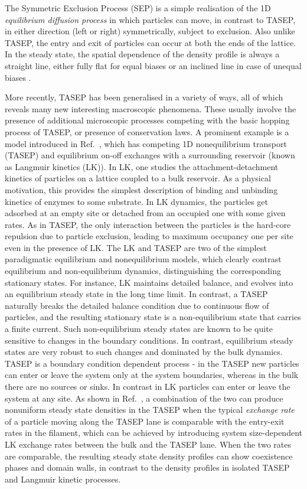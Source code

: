 \documentclass[aps,pre,twocolumn,superscriptaddress,amsmath,amssymb,longbibliography,floatfix,nofootinbib]{revtex4}
\begin{document}
The Symmetric Exclusion Process (SEP) is a simple realisation
of the 1D {\em equilibrium diffusion process} in which particles can move,
in contrast to TASEP, in either direction (left or right) symmetrically, subject to exclusion. Also unlike TASEP,
the entry and exit of particles can occur at both the ends of the lattice. In the steady state,
the spatial dependence of the density profile is always a straight line, either fully flat for
equal biases or an inclined line in case of unequal biases \cite{sep}.

More recently,  TASEP has been generalised in a variety of ways, all of which 
reveals many new interesting macroscopic phenomena. These usually involve the presence of additional  microscopic processes competing with the basic hopping process of TASEP, or presence of conservation laws. A prominent example is a model introduced in Ref.~\cite{frey-lktasep}, which has competing 1D nonequilibrium transport (TASEP)
and equilibrium on-off exchanges with a surrounding reservoir (known as Langmuir kinetics (LK)).
   In LK, one studies the attachment-detachment
kinetics of particles on a lattice coupled to a bulk reservoir. As a physical motivation, this provides the simplest description of binding and unbinding kinetics of enzymes to some substrate. In LK dynamics, the particles get adsorbed
at an empty site or detached from an occupied one with some given rates. As in TASEP,
the only interaction between the particles is the hard-core repulsion due to particle exclusion, leading to maximum occupancy one per site even in the presence of LK.
The LK and TASEP are two of the simplest paradigmatic equilibrium and nonequilibrium models, which clearly contrast
equilibrium and non-equilibrium dynamics, distinguishing the corresponding stationary states. For instance, LK maintains detailed balance, and evolves
into an equilibrium steady state in the long time limit. In contrast, a TASEP naturally breaks the detailed balance condition due to continuous flow of particles, and the resulting  stationary state is a
non-equilibrium state that carries a finite current. Such non-equilibrium steady
states are known to be quite sensitive to changes in the boundary conditions. In contrast, equilibrium steady
states are very robust to such changes and dominated by the bulk dynamics. TASEP is a boundary condition dependent process - in the TASEP
new particles can enter or leave the system only at the system boundaries, whereas
in the bulk there are no sources or sinks. In contrast in LK particles
can enter or leave the system at any site. As shown in Ref.~\cite{frey-lktasep}, a combination of the two can produce nonuniform steady state
densities in the TASEP when the typical    {\em exchange
rate} of a particle moving along the TASEP lane is comparable with the entry-exit rates in
the filament, which can be achieved by introducing  system size-dependent LK exchange rates between the bulk and the TASEP lane. When the two rates are comparable, the resulting steady
state density profiles can show coexistence phases and domain walls, in contrast to the 
density profiles in isolated TASEP and Langmuir kinetic processes.
\end{document}
